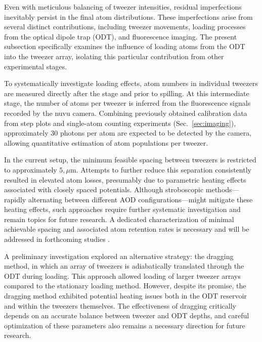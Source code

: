 



Even with meticulous balancing of tweezer intensities, residual imperfections inevitably persist in the final atom distributions. These imperfections arise from several distinct contributions, including tweezer movements, loading processes from the optical dipole trap (ODT), and fluorescence imaging. The present subsection specifically examines the influence of loading atoms from the ODT into the tweezer array, isolating this particular contribution from other experimental stages.

To systematically investigate loading effects, atom numbers in individual tweezers are measured directly after the  stage and prior to spilling. At this intermediate stage, the number of atoms per tweezer is inferred from the fluorescence signals recorded by the nuvu camera. Combining previously obtained calibration data from step plots and single-atom counting experiments (Sec.~\ref{sec:imaging}), approximately 30 photons per atom are expected to be detected by the camera, allowing quantitative estimation of atom populations per tweezer.

In the current setup, the minimum feasible spacing between tweezers is restricted to approximately $5,\mu$m. Attempts to further reduce this separation consistently resulted in elevated atom losses, presumably due to parametric heating effects associated with closely spaced potentials. Although stroboscopic methods—rapidly alternating between different AOD configurations—might mitigate these heating effects, such approaches require further systematic investigation and remain topics for future research. A dedicated characterization of minimal achievable spacing and associated atom retention rates is necessary and will be addressed in forthcoming studies .

A preliminary investigation explored an alternative strategy: the dragging method, in which an array of tweezers is adiabatically translated through the ODT during loading. This approach allowed loading of larger tweezer arrays compared to the stationary loading method. However, despite its promise, the dragging method exhibited potential heating issues both in the ODT reservoir and within the tweezers themselves. The effectiveness of dragging critically depends on an accurate balance between tweezer and ODT depths, and careful optimization of these parameters also remains a necessary direction for future research.

